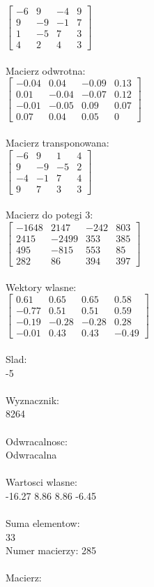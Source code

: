 \documentclass[a4paper,12pt]{article}
\begin{document}
$\begin{bmatrix} -6&9&-4&9\\9&-9&-1&7\\1&-5&7&3\\4&2&4&3 \end{bmatrix}$
\\
\\
Macierz odwrotna:\\

$\begin{bmatrix} -0.04&0.04&-0.09&0.13\\0.01&-0.04&-0.07&0.12\\-0.01&-0.05&0.09&0.07\\0.07&0.04&0.05&0 \end{bmatrix}$
\\
\\
Macierz transponowana:\\

$\begin{bmatrix} -6&9&1&4\\9&-9&-5&2\\-4&-1&7&4\\9&7&3&3 \end{bmatrix}$
\\
\\
Macierz do potegi 3:\\

$\begin{bmatrix} -1648&2147&-242&803\\2415&-2499&353&385\\495&-815&553&85\\282&86&394&397 \end{bmatrix}$
\\
\\
Wektory wlasne:\\

$\begin{bmatrix} 0.61&0.65&0.65&0.58\\-0.77&0.51&0.51&0.59\\-0.19&-0.28&-0.28&0.28\\-0.01&0.43&0.43&-0.49 \end{bmatrix}$
\\
\\
Slad:\\
-5
\\
\\
Wyznacznik:\\
8264
\\
\\
Odwracalnosc:\\
Odwracalna
\\
\\
Wartosci wlasne:\\
-16.27 8.86 8.86 -6.45
\\
\\
Suma elementow:\\
33
\\
\newpage
Numer macierzy:
285
\\
\\
Macierz:\\
\end{document}
